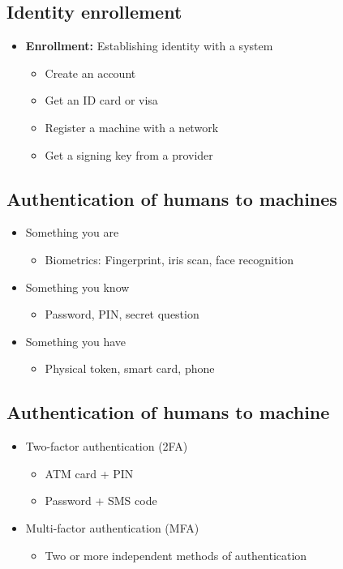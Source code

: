 \documentclass[12pt,a4paper]{article}
\begin{document}
\subsection{Identity enrollement}
\begin{itemize}
    \item \textbf{Enrollment:} Establishing identity with a system
    \begin{itemize}
        \item Create an account 
        \item Get an ID card or visa
        \item Register a machine with a network
        \item Get a signing key from a provider
    \end{itemize}
\end{itemize}

\subsection{Authentication of humans to machines}
\begin{itemize}
    \item Something you are
    \begin{itemize}
        \item Biometrics: Fingerprint, iris scan, face recognition
    \end{itemize}
    \item Something you know
    \begin{itemize}
        \item Password, PIN, secret question
    \end{itemize}
    \item Something you have
    \begin{itemize}
        \item Physical token, smart card, phone
    \end{itemize}
\end{itemize}

\subsection{Authentication of humans to machine}
\begin{itemize}
    \item Two-factor authentication (2FA)
    \begin{itemize}
        \item ATM card + PIN
        \item Password + SMS code
    \end{itemize}
    \item Multi-factor authentication (MFA)
    \begin{itemize}
        \item Two or more independent methods of authentication
    \end{itemize}
\end{itemize}
\end{document}
